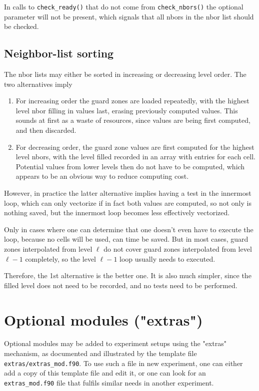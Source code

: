 \documentclass[paper=a4,fontsize=11pt]{scrartcl}
\numberwithin{equation}{section}		%
\numberwithin{figure}{section}			%
\numberwithin{table}{section}				%
\newcommand{\codecolor}{\color{Blue}}
\newcommand{\filecolor}{\color{NavyBlue}}
\newcommand{\File}[1]{{\filecolor\texttt{#1}}}
\newcommand{\Code}[1]{{\codecolor\texttt{#1}}}
\def\checkready{\Code{check\_ready()}}
\def\checknbors{\Code{check\_nbors()}}
\begin{document}
In calls to \checkready{} that do not come from \checknbors{} the optional parameter will not be present, which signals that all nbors in the nbor list should be checked.

\subsection{Neighbor-list sorting}
The nbor lists may either be sorted in increasing or decreasing level order.  The two alternatives imply
\begin{enumerate}
    \item For increasing order the guard zones are loaded repeatedly, with the highest level nbor filling in values last, erasing previously computed values.  This sounds at first as a waste of resources, since values are being first computed, and then discarded.
    \item For decreasing order, the guard zone values are first computed for the highest level nbors, with the level filled recorded in an array with entries for each cell.  Potential values from lower levels then do not have to be computed, which appears to be an obvious way to reduce computing cost.
\end{enumerate}
However, in practice the latter alternative implies having a test in the innermost loop, which can only vectorize if in fact both values are computed, so not only is nothing saved, but the innermost loop becomes less effectively vectorized.

Only in cases where one can determine that one doesn't even have to execute the loop, because no cells will be used, can time be saved.  But in most cases, guard zones interpolated from level $\ell$ do not cover guard zones interpolated from level $\ell-1$ completely, so the level $\ell-1$ loop usually needs to executed.

Therefore, the 1st alternative is the better one.  It is also much simpler, since the filled level does not need to be recorded, and no tests need to be performed.

\section{Optional modules ("extras")}
Optional modules may be added to experiment setups using the "extras" mechanism, as documented and illustrated by the template file \File{extras/extras\_mod.f90}.  To use such a file in new experiment, one can either add a copy of this template file and edit it, or one can look for an \File{extras\_mod.f90} file that fulfils similar needs in another experiment.
\end{document}
